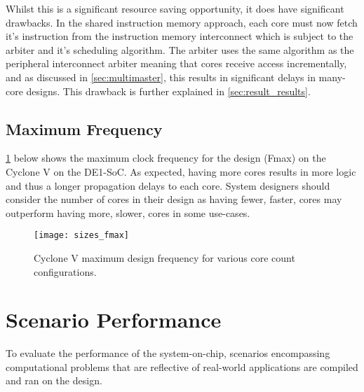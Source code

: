 Whilst this is a significant resource saving opportunity, it does have significant drawbacks. In the shared instruction memory approach, each core must now fetch it's instruction from the instruction memory interconnect which is subject to the arbiter and it's scheduling algorithm. The arbiter uses the same algorithm as the peripheral interconnect arbiter meaning that cores receive access incrementally, and as discussed in \cref{sec:multimaster}, this results in significant delays in many-core designs. This drawback is further explained in \cref{sec:result_results}.



\subsection{Maximum Frequency}
\cref{fig:sizes_fmax} below shows the maximum clock frequency for the design (Fmax) on the Cyclone V on the DE1-SoC. As expected, having more cores results in more logic and thus a longer  propagation delays to each core. System designers should consider the number of cores in their design as having fewer, faster, cores may outperform having more, slower, cores in some use-cases.

\begin{figure}[h]
\centering
\texttt{[image: sizes\_fmax]}
\caption{Cyclone V maximum design frequency for various core count configurations.}
\label{fig:sizes_fmax}
\end{figure}

\section{Scenario Performance}
To evaluate the performance of the system-on-chip, scenarios encompassing computational problems that are reflective of real-world applications are compiled and ran on the design.

